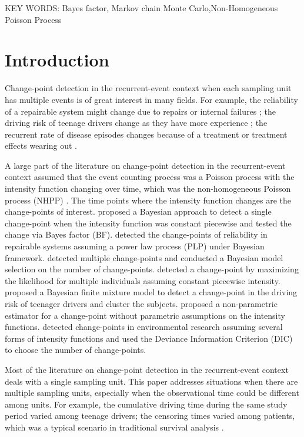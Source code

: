\documentclass[12pt]{article}
\numberwithin{equation}{section}
\begin{document}
\vspace*{.3in}

\noindent KEY WORDS: {Bayes factor, Markov chain Monte Carlo,Non-Homogeneous Poisson Process}
\section{Introduction}
Change-point detection in the recurrent-event context when each sampling unit has multiple events is of great interest in many fields. For example, the reliability of a repairable system might change due to repairs or internal failures \citep{Ruggeri2005}; the driving risk of teenage drivers change as they have more experience \citep{Li2017a}; the recurrent rate of disease episodes changes because of a treatment or treatment effects wearing out \citep{Frobish2009}. 

A large part of the literature on change-point detection in the recurrent-event context assumed that the event counting process was a Poisson process with the intensity function changing over time, which was  the non-homogeneous Poisson process (NHPP) \citep[p.~32]{Ross2006}. The time points where the intensity function changes are the change-points of interest. \citet{Raftery1986,Gupta2015} proposed a Bayesian approach to detect a single change-point when the intensity function was constant piecewise and tested the change via Bayes factor (BF).  \citet{Ruggeri2005} detected the change-points of reliability in repairable systems assuming a power law process (PLP) under Bayesian framework. \citet{Achcar2007, Montoya2017} detected multiple change-points and conducted a Bayesian model selection on the number of change-points.  \citet{Frobish2009, Li2017a} detected a change-point by maximizing the likelihood for multiple individuals assuming constant piecewise intensity.  \citet{Li2017b} proposed a Bayesian finite mixture model to detect a change-point in the driving risk of teenager drivers and cluster the subjects.  \citet{Frobish2016} proposed a non-parametric estimator for a change-point without parametric assumptions on the intensity functions. \citet{Cruz2016,Achcar2016} detected change-points in environmental research assuming several forms of intensity functions and used the Deviance Information Criterion (DIC) to choose the number of change-points. 

Most of the literature on change-point detection in the recurrent-event context deals with a single sampling unit. This paper addresses situations when there are multiple sampling units, especially when the observational time could be different among units. For example, the cumulative driving time during the same study period \citep{Li2017a} varied among teenage drivers;  the censoring times varied among patients, which was a typical scenario in traditional survival analysis \citep{Frobish2009}.     
\end{document}
